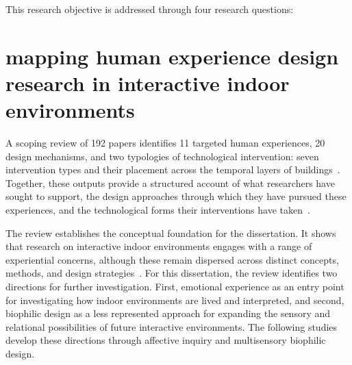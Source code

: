 This research objective is addressed through four research questions:
\begin{researchquestions}
\end{researchquestions}

\section{mapping human experience design research in interactive indoor environments}

A scoping review of 192 papers identifies 11 targeted human experiences,
20 design mechanisms, and two typologies of technological intervention:
seven intervention types and their placement across the temporal layers
of buildings~\cite{rao2025smart}. Together, these outputs provide a structured account of
what researchers have sought to support, the design approaches through
which they have pursued these experiences, and the technological forms
their interventions have taken~\cite{rao2025smart}.

The review establishes the conceptual foundation for the dissertation. It shows that research on interactive indoor environments engages with a range of experiential concerns, although these remain dispersed across distinct concepts, methods, and design strategies~\cite{rao2025smart}. For this dissertation, the review identifies two directions for further investigation. First, emotional experience as an entry point for investigating how indoor environments are lived and interpreted, and second, biophilic design as a less represented approach for expanding the sensory and relational possibilities of future interactive environments. The following studies develop these directions through affective inquiry and multisensory biophilic design.

